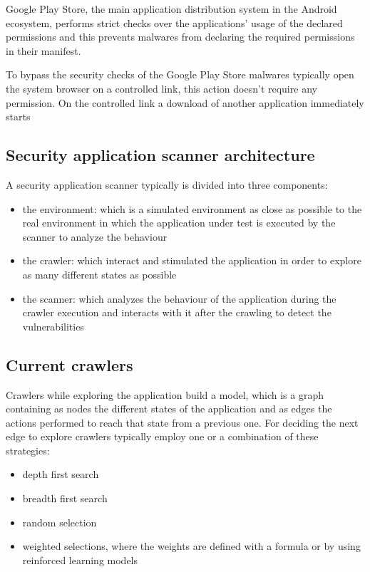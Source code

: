 Google Play Store, the main application distribution system in the
Android ecosystem, performs strict checks over the applications' usage
of the declared permissions and this prevents malwares from declaring
the required permissions in their manifest.

To bypass the security checks of the Google Play Store malwares
typically open the system browser on a controlled link, this action
doesn't require any permission. On the controlled link a download of
another application immediately starts

\subsection{Security application scanner
architecture}\label{security-application-scanner-architecture}

A security application scanner typically is divided into three
components:

\begin{itemize}
\item
  the environment: which is a simulated environment as close as possible
  to the real environment in which the application under test is
  executed by the scanner to analyze the behaviour
\item
  the crawler: which interact and stimulated the application in order to
  explore as many different states as possible
\item
  the scanner: which analyzes the behaviour of the application during
  the crawler execution and interacts with it after the crawling to
  detect the vulnerabilities
\end{itemize}

\subsection{Current crawlers}\label{current-crawlers}

Crawlers while exploring the application build a model, which is a graph
containing as nodes the different states of the application and as edges
the actions performed to reach that state from a previous one. For
deciding the next edge to explore crawlers typically employ one or a
combination of these strategies:

\begin{itemize}
\tightlist
\item
  depth first search
\item
  breadth first search
\item
  random selection
\item
  weighted selections, where the weights are defined with a formula or
  by using reinforced learning models
\end{itemize}

